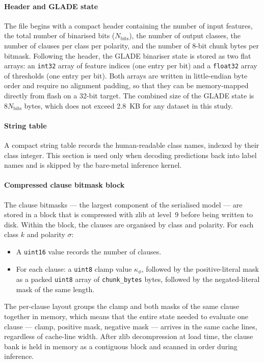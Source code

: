 \documentclass[journal,10pt]{IEEEtran}
\begin{document}
\paragraph{Header and GLADE state}
The file begins with a compact header containing the number of
input features, the total number of binarised bits ($N_\text{bits}$),
the number of output classes, the number of clauses per class per
polarity, and the number of 8-bit chunk bytes per bitmask. Following
the header, the GLADE binariser state is stored as two flat arrays:
an \texttt{int32} array of feature indices (one entry per bit) and a
\texttt{float32} array of thresholds (one entry per bit). Both arrays
are written in little-endian byte order and require no alignment
padding, so that they can be memory-mapped directly from flash on a
32-bit target. The combined size of the GLADE state is
$8 N_\text{bits}$ bytes, which does not exceed 2.8~KB for any
dataset in this study.

\paragraph{String table}
A compact string table records the human-readable class names, indexed
by their class integer. This section is used only when decoding
predictions back into label names and is skipped by the bare-metal
inference kernel.

\paragraph{Compressed clause bitmask block}
The clause bitmasks --- the largest component of the serialised model
--- are stored in a block that is compressed with zlib at level~9
before being written to disk. Within the block, the clauses are
organised by class and polarity. For each class $k$ and polarity
$\sigma$:

\begin{itemize}
  \item A \texttt{uint16} value records the number of clauses.
  \item For each clause: a \texttt{uint8} clamp value $\kappa_\phi$,
        followed by the positive-literal mask as a packed
        \texttt{uint8} array of \texttt{chunk\_bytes} bytes,
        followed by the negated-literal mask of the same length.
\end{itemize}

The per-clause layout groups the clamp and both masks of the same
clause together in memory, which means that the entire state needed
to evaluate one clause --- clamp, positive mask, negative mask ---
arrives in the same cache lines, regardless of cache-line width.
After zlib decompression at load time, the clause bank is held
in memory as a contiguous block and scanned in order during
inference.
\end{document}
